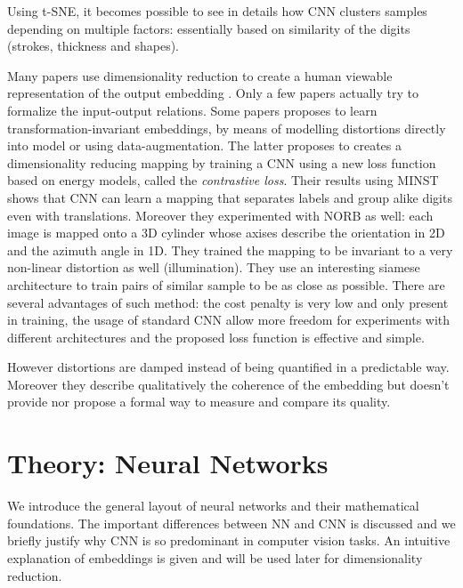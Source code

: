 \documentclass[a4paper,12pt]{report}
\begin{document}
Using t-SNE, it becomes possible to see in details how CNN clusters samples depending on multiple factors: essentially based on similarity of the digits (strokes, thickness and shapes).

Many papers use dimensionality reduction to create a human viewable representation of the output embedding \cite{donahue2013decaf}\cite{yu2014visualizing}\cite{yaotiny}.
Only a few papers actually try to formalize the input-output relations\cite{goodfellow2009measuring}.
Some papers proposes to learn transformation-invariant embeddings, by means of modelling distortions directly into model\cite{gens2014deep} or using data-augmentation\cite{hadsell2006dimensionality}.
The latter proposes to creates a dimensionality reducing mapping by training a CNN using a new loss function based on energy models, called the {\em contrastive loss}.
Their results using MINST shows that CNN can learn a mapping that separates labels and group alike digits even with translations.
Moreover they experimented with NORB as well: each image is mapped onto a 3D cylinder whose axises describe the orientation in 2D and the azimuth angle in 1D.
They trained the mapping to be invariant to a very non-linear distortion as well (illumination).
They use an interesting siamese architecture to train pairs of similar sample to be as close as possible.
There are several advantages of such method: the cost penalty is very low and only present in training, the usage of standard CNN allow more freedom for experiments with different architectures and the proposed loss function is effective and simple.

However distortions are damped instead of being quantified in a predictable way.
Moreover they describe qualitatively the coherence of the embedding but doesn't provide nor propose a formal way to measure and compare its quality.


\chapter{Theory: Neural Networks}
We introduce the general layout of neural networks and their mathematical foundations.
The important differences between NN and CNN is discussed and we briefly justify why CNN is so predominant in computer vision tasks.
An intuitive explanation of embeddings is given and will be used later for dimensionality reduction.
\end{document}
